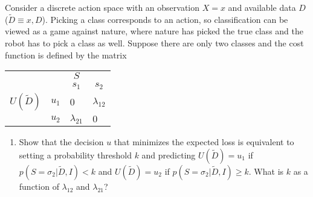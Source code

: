 \begin{example}
	Consider a discrete action space with an observation $X=x$ and available data $D$ ($\tilde{D} \equiv {x, D}$). Picking a class corresponds to an action, so classification can be viewed as a game against nature, where nature has picked the true class and the robot has to pick a class as well. Suppose there are only two classes and the cost function is defined by the matrix
	\begin{center}
		\begin{tabular}{ c  c  c  c }
			&& $S$& \\
			&& $s_1$ & $s_2$  \\
			\cline{3-4}
			$U(\tilde{D})$ & $u_1$& \multicolumn{1}{|l}{$0$} &\multicolumn{1}{l|}{$\lambda_{12}$}  \\
			& $u_2$& \multicolumn{1}{|l}{$\lambda_{21}$} & \multicolumn{1}{l|}{$0$} \\
			\cline{3-4}
		\end{tabular}
	\end{center}
	\begin{enumerate}
		\item Show that the decision $u$ that minimizes the expected loss is equivalent to setting a probability threshold $k$ and predicting $U(\tilde{D})=u_1$ if $p(S=\sigma_2|\tilde{D},I) < k$ and $U(\tilde{D})=u_2$ if $p(S=\sigma_2|\tilde{D},I)\geq k$. What is $k$ as a function of $\lambda_{12}$ and $\lambda_{21}$?\newline
		

\end{enumerate}
\end{example}
